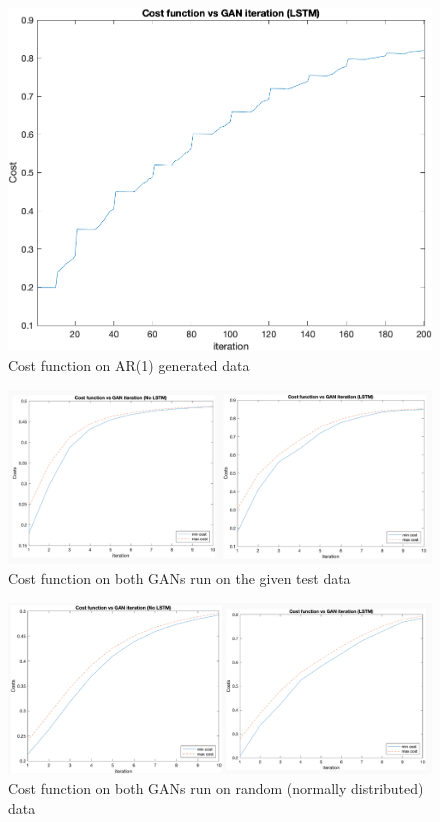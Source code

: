 \documentclass[10pt]{article}
\begin{document}
\begin{figure}[h]
    \centering
    \includegraphics[angle=0,scale=.6]{costfunction}
    \caption{Cost function on AR(1) generated data}
\end{figure}

\begin{figure}[h]
    \includegraphics[angle=0,scale=.6]{testdata}
    \caption{Cost function on both GANs run on the given test data}
\end{figure}

\begin{figure}[h]
    \includegraphics[angle=0,scale=.6]{randomdata}
    \caption{Cost function on both GANs run on random (normally distributed) data}
\end{figure}
\end{document}
